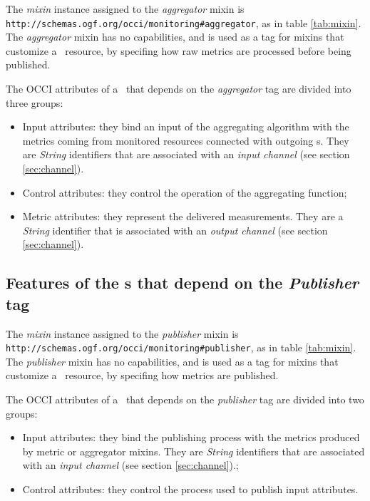 \documentclass[10pt,a4paper]{article}
\begin{document}
The {\em mixin} instance assigned to the {\em aggregator} mixin is {\tt http://schemas.ogf.org/occi/monitoring\#aggregator}, as in table \ref{tab:mixin}. The {\em aggregator} mixin has no capabilities, and is used as a tag for mixins that customize a \sens\ resource, by specifing how raw metrics are processed before being published.

The OCCI attributes of a \mi\ that depends on the {\em aggregator} tag are divided into three groups:

\begin{itemize}

\item Input attributes: they bind an input of the aggregating algorithm with the metrics coming from monitored resources connected with outgoing \coll s. They are {\em String} identifiers that are associated with an {\em input channel} (see section \ref{sec:channel}).
\item Control attributes: they control the operation of the aggregating function;
\item Metric attributes: they represent the delivered measurements. They are a {\em String} identifier that is associated with an {\em output channel} (see section \ref{sec:channel}).
\end{itemize}

\subsection{Features of the \mi s that depend on the {\em Publisher} tag \label{sec:publisher}}

The {\em mixin} instance assigned to the {\em publisher} mixin is {\tt http://schemas.ogf.org/occi/monitoring\#publisher}, as in table \ref{tab:mixin}. The {\em publisher} mixin has no capabilities, and is used as a tag for mixins that customize a \sens\ resource, by specifing how metrics are published.

The OCCI attributes of a \mi\ that depends on the {\em publisher} tag are divided into two groups:

\begin{itemize}
\item Input attributes: they bind the publishing process with the metrics produced by metric or aggregator mixins. They are {\em String} identifiers that are associated with an {\em input channel} (see section \ref{sec:channel}).;
\item Control attributes: they control the process used to publish input attributes.
\end{itemize}
\end{document}
